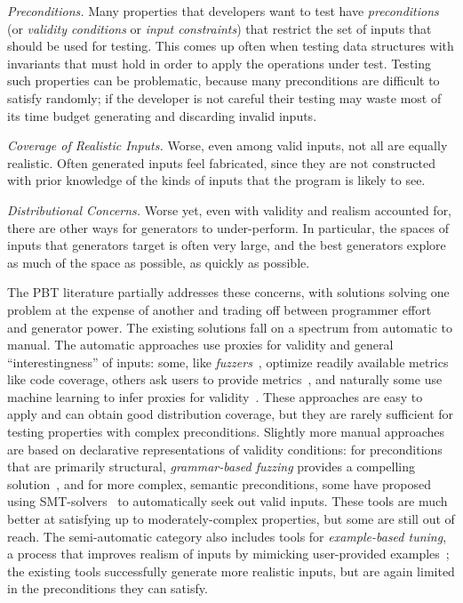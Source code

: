 {\em Preconditions.}
Many properties that developers want to test have {\em preconditions}
(or {\em validity conditions} or {\em input constraints}) that
restrict the set of inputs that should be used for testing. This comes up often
when testing data structures with invariants that must hold in order to apply
the operations under test. Testing such properties can be problematic, because
many preconditions are difficult to satisfy randomly; if the developer is not
careful their testing may waste most of its time budget generating and
discarding invalid inputs.

{\em Coverage of Realistic Inputs.}
Worse, even among valid inputs, not all are equally realistic. Often generated inputs
feel fabricated, since they are not constructed with prior knowledge of the
kinds of inputs that the program is likely to see.

{\em Distributional Concerns.}
Worse yet, even with validity and realism accounted for, there are other ways for
generators to under-perform. In particular, the spaces of inputs that generators
target is often very large, and the best generators explore as much of the space
as possible, as quickly as possible.

The PBT literature partially addresses these concerns, with solutions solving
one problem at the expense of another and trading off between programmer effort
and generator power.
The existing solutions
fall on a spectrum from automatic to manual. The automatic approaches use
proxies for validity and general ``interestingness'' of inputs: some, like {\em
fuzzers}~\cite{afl-readme}, optimize readily available metrics like code
coverage, others ask users to provide metrics~\cite{loscher2017targetedpbt}, and
naturally some use machine learning to infer proxies for
validity~\cite{godefroid2017learn, DBLP:conf/icse/ReddyLPS20}. These approaches
are easy to apply and can obtain good distribution coverage, but they are rarely
sufficient for testing properties with complex preconditions. Slightly more
manual approaches are based on declarative representations of validity
conditions: for preconditions that are primarily structural, {\em grammar-based
fuzzing} provides a compelling solution~\cite{godefroid2008grammar,
holler2012fuzzing, veggalam2016ifuzzer, wang2019superion,
srivastava2021gramatron}, and for more complex, semantic preconditions, some
have proposed using SMT-solvers~\cite{dewey2017automated, LuckPOPL,
steinhofel2022input} to automatically seek out valid inputs. These tools are
much better at satisfying up to moderately-complex properties, but some are
still out of reach. The semi-automatic
category also includes tools for {\em example-based tuning}, a process that
improves realism of inputs by mimicking user-provided
examples~\cite{soremekun2020inputs}; the existing tools successfully generate
more realistic inputs, but are again limited in the preconditions they can
satisfy.

